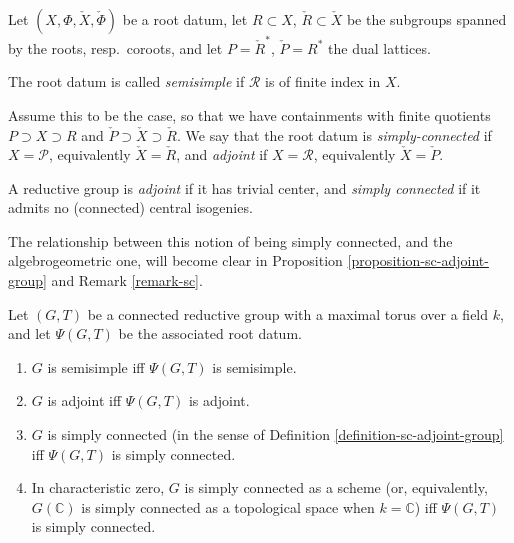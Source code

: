 \begin{definition}
 \label{definition-sc-adjoint-rootdatum}
Let $(X,\Phi,\check X,\check\Phi)$ be a root datum, let $R\subset X$, $\check R\subset \check X$ be the subgroups spanned by the roots, resp.\ coroots, and let $P = \check R^*$, $\check P = R^*$ the dual lattices. 

The root datum is called {\it semisimple} if $\mathcal R$ is of finite index in $X$. 

Assume this to be the case, so that we have containments with finite quotients $P\supset X\supset R$ and $\check P\supset\check X\supset \check R$. We say that the root datum  is {\it simply-connected} if $X=\mathcal P$, equivalently $\check X=\check R$, and {\it adjoint} if $X=\mathcal R$, equivalently $\check X =\check P$. 
\end{definition}

\begin{definition}
 \label{definition-sc-adjoint-group}
A reductive group is {\it adjoint} if it has trivial center, and {\it simply connected} if it admits no (connected) central isogenies.
\end{definition}

The relationship between this notion of being simply connected, and the algebrogeometric one, will become clear in Proposition  \ref{proposition-sc-adjoint-group} and Remark \ref{remark-sc}.




\begin{proposition}
 \label{proposition-sc-adjoint-group}
Let $(G,T)$ be a connected reductive group with a maximal torus over a field $k$, and let $\Psi(G,T)$ be the associated root datum.
\begin{enumerate}
\item $G$ is semisimple iff $\Psi(G,T)$ is semisimple.
\item $G$ is adjoint iff $\Psi(G,T)$ is adjoint.
\item $G$ is simply connected (in the sense of Definition \ref{definition-sc-adjoint-group} iff $\Psi(G,T)$ is simply connected. 
\item In characteristic zero, $G$ is simply connected as a scheme (or, equivalently, $G(\mathbb C)$ is simply connected as a topological space when $k=\mathbb C$) iff $\Psi(G,T)$ is simply connected.
\end{enumerate}

\end{proposition}

